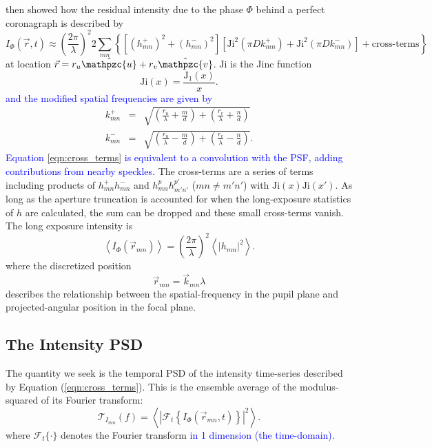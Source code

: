 \documentclass[10pt,preprint]{aastex631}
\newcommand{\jrmadd}[1]{\textcolor{blue}{#1}}
\newcommand{\Ji}{\mathrm{Ji}}
\begin{document}
\citet{2018JATIS...4a9001M} then showed how the residual intensity due to the phase $\Phi$ behind a perfect coronagraph is described by
\begin{equation}
I_\Phi(\vec{r},t) \approx \left(\frac{2\pi}{\lambda}\right)^2 2 \sum_{mn} \left\{  \left[ (h_{mn}^{+})^2 + (h_{mn}^{-})^2 \right] \left[ \Ji^2(\pi D k_{mn}^+) +\Ji^2(\pi D k_{mn}^-)\right] + \mbox{cross-terms} \right\}
\label{eqn:cross_terms}
\end{equation}
at location $\vec{r} = r_u \hat{\mathpzc{u}} + r_v\hat{\mathpzc{v}}$. $\Ji$ is the Jinc function
\begin{equation}
\Ji(x) = \frac{\mathrm{J}_1(x)}{x}.
\end{equation}
\jrmadd{and the modified spatial frequencies are given by} 
\begin{eqnarray}
k_{mn}^+ &=& \sqrt{\left(\frac{r_u}{\lambda} + \frac{m}{d}\right) + \left(\frac{r_v}{\lambda} + \frac{n}{d}\right)} \\ 
k_{mn}^- &=& \sqrt{\left(\frac{r_u}{\lambda} - \frac{m}{d}\right) + \left(\frac{r_v}{\lambda} - \frac{n}{d}\right)}. \nonumber
\end{eqnarray}
\jrmadd{Equation \ref{eqn:cross_terms} is equivalent to a convolution with the PSF, adding contributions from nearby speckles.}  The cross-terms are a series of terms including products of $h_{mn}^+h_{mn}^-$ and $h_{mn}^ph_{m'n'}^{p'}$ ($mn \neq m'n'$) with $\Ji(x)\Ji(x')$.  As long as the aperture truncation is accounted for when the long-exposure statistics of $h$ are calculated, the sum can be dropped and these small cross-terms vanish.  The long exposure intensity is 
\begin{equation}
\left< I_\Phi(\vec{r}_{mn}) \right> =  \left(\frac{2\pi}{\lambda}\right)^2\left< |h_{mn}|^2 \right> .
\label{eqn:contrast_h2}
\end{equation}
where the discretized position 
\begin{equation}
\vec{r}_{mn} = \vec{k}_{mn} \lambda
\end{equation}
describes the relationship between the spatial-frequency in the pupil plane and projected-angular position in the focal plane.

\subsection{The Intensity PSD}

The quantity we seek is the temporal PSD of the intensity time-series described by Equation (\ref{eqn:cross_terms}).  This is the ensemble average of the modulus-squared of its Fourier transform:
\begin{equation}
\mathcal{T}_{I_{mn}}(f) = \left\langle \left| \mathcal{F}_t \left\{ I_\Phi(\vec{r}_{mn},t) \right\} \right|^2 \right\rangle.
\end{equation}
where $\mathcal{F}_t\{\cdot\}$ denotes the Fourier transform \jrmadd{in 1 dimension (the time-domain)}.
\end{document}
